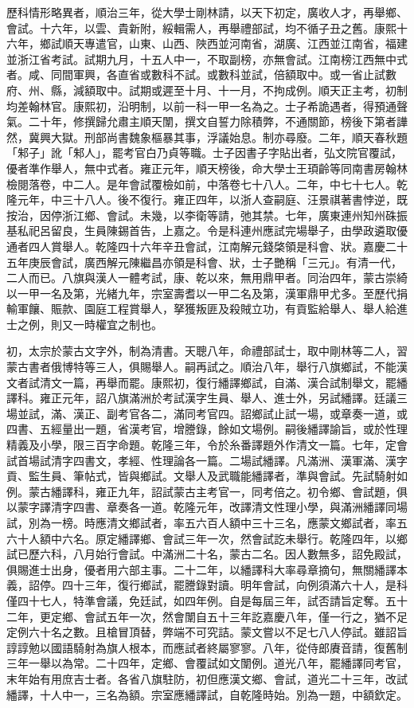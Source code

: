 \begin{pinyinscope}
歷科情形略異者，順治三年，從大學士剛林請，以天下初定，廣收人才，再舉鄉、會試。十六年，以雲、貴新附，綏輯需人，再舉禮部試，均不循子丑之舊。康熙十六年，鄉試順天專遣官，山東、山西、陜西並河南省，湖廣、江西並江南省，福建並浙江省考試。試期九月，十五人中一，不取副榜，亦無會試。江南榜江西無中式者。咸、同間軍興，各直省或數科不試。或數科並試，倍額取中。或一省止試數府、州、縣，減額取中。試期或遲至十月、十一月，不拘成例。順天正主考，初制均差翰林官。康熙初，沿明制，以前一科一甲一名為之。士子希詭遇者，得預通聲氣。二十年，修撰歸允肅主順天闈，撰文自誓力除積弊，不通關節，榜後下第者譁然，冀興大獄。刑部尚書魏象樞暴其事，浮議始息。制亦尋廢。二年，順天春秋題「邾子」訛「邾人」，罷考官白乃貞等職。士子因書子字貼出者，弘文院官覆試，優者準作舉人，無中式者。雍正元年，順天榜後，命大學士王頊齡等同南書房翰林檢閱落卷，中二人。是年會試覆檢如前，中落卷七十八人。二年，中七十七人。乾隆元年，中三十八人。後不復行。雍正四年，以浙人查嗣庭、汪景祺著書悖逆，既按治，因停浙江鄉、會試。未幾，以李衛等請，弛其禁。七年，廣東連州知州硃振基私祀呂留良，生員陳錫首告，上嘉之。令是科連州應試完場舉子，由學政遴取優通者四人賞舉人。乾隆四十六年辛丑會試，江南解元錢棨領是科會、狀。嘉慶二十五年庚辰會試，廣西解元陳繼昌亦領是科會、狀，士子艷稱「三元」。有清一代，二人而已。八旗與漢人一體考試，康、乾以來，無用鼎甲者。同治四年，蒙古崇綺以一甲一名及第，光緒九年，宗室壽耆以一甲二名及第，漢軍鼎甲尤多。至歷代捐輸軍饟、賑款、園庭工程賞舉人，拏獲叛匪及殺賊立功，有貢監給舉人、舉人給進士之例，則又一時權宜之制也。

初，太宗於蒙古文字外，制為清書。天聰八年，命禮部試士，取中剛林等二人，習蒙古書者俄博特等三人，俱賜舉人。嗣再試之。順治八年，舉行八旗鄉試，不能漢文者試清文一篇，再舉而罷。康熙初，復行繙譯鄉試，自滿、漢合試制舉文，罷繙譯科。雍正元年，詔八旗滿洲於考試漢字生員、舉人、進士外，另試繙譯。廷議三場並試，滿、漢正、副考官各二，滿同考官四。詔鄉試止試一場，或章奏一道，或四書、五經量出一題，省漢考官，增謄錄，餘如文場例。嗣後繙譯諭旨，或於性理精義及小學，限三百字命題。乾隆三年，令於糸番譯題外作清文一篇。七年，定會試首場試清字四書文，孝經、性理論各一篇。二場試繙譯。凡滿洲、漢軍滿、漢字貢、監生員、筆帖式，皆與鄉試。文舉人及武職能繙譯者，準與會試。先試騎射如例。蒙古繙譯科，雍正九年，詔試蒙古主考官一，同考倍之。初令鄉、會試題，俱以蒙字譯清字四書、章奏各一道。乾隆元年，改譯清文性理小學，與滿洲繙譯同場試，別為一榜。時應清文鄉試者，率五六百人額中三十三名，應蒙文鄉試者，率五六十人額中六名。原定繙譯鄉、會試三年一次，然會試訖未舉行。乾隆四年，以鄉試已歷六科，八月始行會試。中滿洲二十名，蒙古二名。因人數無多，詔免殿試，俱賜進士出身，優者用六部主事。二十二年，以繙譯科大率尋章摘句，無關繙譯本義，詔停。四十三年，復行鄉試，罷謄錄對讀。明年會試，向例須滿六十人，是科僅四十七人，特準會議，免廷試，如四年例。自是每屆三年，試否請旨定奪。五十二年，更定鄉、會試五年一次，然會闈自五十三年訖嘉慶八年，僅一行之，猶不足定例六十名之數。且槍冒頂替，弊端不可究詰。蒙文嘗以不足七八人停試。雖詔旨諄諄勉以國語騎射為旗人根本，而應試者終屬寥寥。八年，從侍郎賡音請，復舊制三年一舉以為常。二十四年，定鄉、會覆試如文闈例。道光八年，罷繙譯同考官，末年始有用庶吉士者。各省八旗駐防，初但應漢文鄉、會試，道光二十三年，改試繙譯，十人中一，三名為額。宗室應繙譯試，自乾隆時始。別為一題，中額欽定。


\end{pinyinscope}
